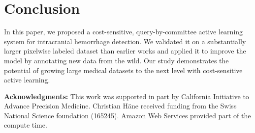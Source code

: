 \documentclass{llncs}
\begin{document}
\vspace*{-0.15cm}
\section{Conclusion}
\vspace*{-0.25cm}
In this paper, we proposed a cost-sensitive, query-by-committee active learning system for intracranial hemorrhage detection. We validated it on a substantially larger pixelwise labeled dataset than earlier works and applied it to improve the model by annotating new data from the wild. Our study demonstrates the potential of growing large medical  datasets to the next level with cost-sensitive active learning. 

\vspace{0.1cm}

\noindent \textbf{Acknowledgments:} This work was supported in part by California Initiative to Advance Precision Medicine. Christian H{\"a}ne received funding from the Swiss National Science foundation (165245). Amazon Web Services provided part of the compute time.

{\small


}
\end{document}
